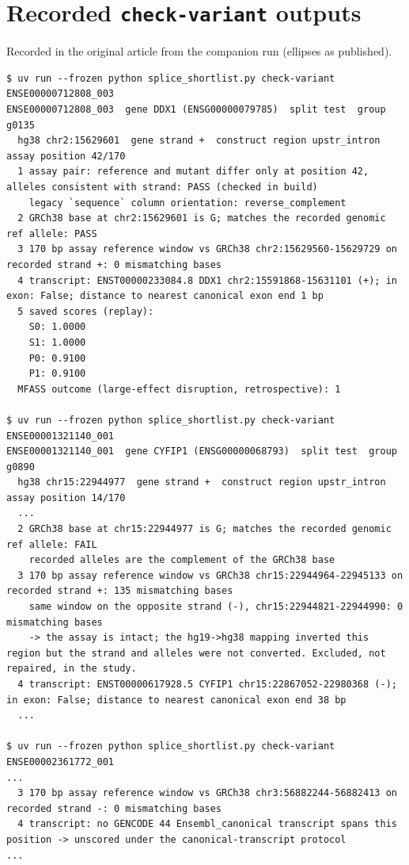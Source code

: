 \documentclass[11pt]{article}
\begin{document}
\section{Recorded \texttt{check-variant} outputs}\label{app:checkvariant}
Recorded in the original article from the companion run (ellipses as published).
\begin{lstlisting}
$ uv run --frozen python splice_shortlist.py check-variant ENSE00000712808_003
ENSE00000712808_003  gene DDX1 (ENSG00000079785)  split test  group g0135
  hg38 chr2:15629601  gene strand +  construct region upstr_intron  assay position 42/170
  1 assay pair: reference and mutant differ only at position 42, alleles consistent with strand: PASS (checked in build)
    legacy `sequence` column orientation: reverse_complement
  2 GRCh38 base at chr2:15629601 is G; matches the recorded genomic ref allele: PASS
  3 170 bp assay reference window vs GRCh38 chr2:15629560-15629729 on recorded strand +: 0 mismatching bases
  4 transcript: ENST00000233084.8 DDX1 chr2:15591868-15631101 (+); in exon: False; distance to nearest canonical exon end 1 bp
  5 saved scores (replay):
    S0: 1.0000
    S1: 1.0000
    P0: 0.9100
    P1: 0.9100
  MFASS outcome (large-effect disruption, retrospective): 1

$ uv run --frozen python splice_shortlist.py check-variant ENSE00001321140_001
ENSE00001321140_001  gene CYFIP1 (ENSG00000068793)  split test  group g0890
  hg38 chr15:22944977  gene strand +  construct region upstr_intron  assay position 14/170
  ...
  2 GRCh38 base at chr15:22944977 is G; matches the recorded genomic ref allele: FAIL
    recorded alleles are the complement of the GRCh38 base
  3 170 bp assay reference window vs GRCh38 chr15:22944964-22945133 on recorded strand +: 135 mismatching bases
    same window on the opposite strand (-), chr15:22944821-22944990: 0 mismatching bases
    -> the assay is intact; the hg19->hg38 mapping inverted this region but the strand and alleles were not converted. Excluded, not repaired, in the study.
  4 transcript: ENST00000617928.5 CYFIP1 chr15:22867052-22980368 (-); in exon: False; distance to nearest canonical exon end 38 bp
  ...

$ uv run --frozen python splice_shortlist.py check-variant ENSE00002361772_001
...
  3 170 bp assay reference window vs GRCh38 chr3:56882244-56882413 on recorded strand -: 0 mismatching bases
  4 transcript: no GENCODE 44 Ensembl_canonical transcript spans this position -> unscored under the canonical-transcript protocol
...
\end{lstlisting}
\end{document}
